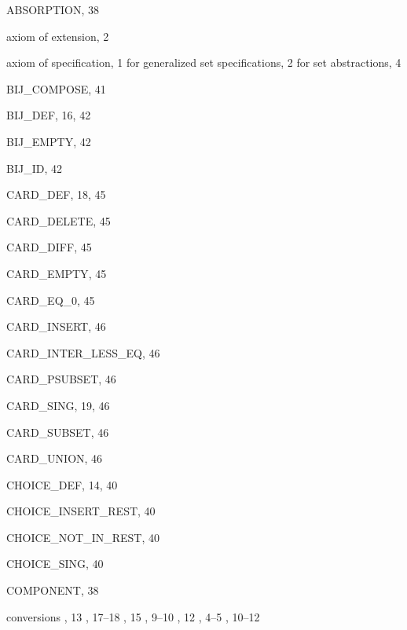 \begin{theindex}

  \item {\ptt ABSORPTION}, 38
  \item axiom of extension, 2
  \item axiom of specification, 1
    \subitem for generalized set specifications, 2
    \subitem for set abstractions, 4

  \indexspace

  \item {\ptt BIJ\_COMPOSE}, 41
  \item {\ptt BIJ\_DEF}, 16, 42
  \item {\ptt BIJ\_EMPTY}, 42
  \item {\ptt BIJ\_ID}, 42

  \indexspace

  \item {\ptt CARD\_DEF}, 18, 45
  \item {\ptt CARD\_DELETE}, 45
  \item {\ptt CARD\_DIFF}, 45
  \item {\ptt CARD\_EMPTY}, 45
  \item {\ptt CARD\_EQ\_0}, 45
  \item {\ptt CARD\_INSERT}, 46
  \item {\ptt CARD\_INTER\_LESS\_EQ}, 46
  \item {\ptt CARD\_PSUBSET}, 46
  \item {\ptt CARD\_SING}, 19, 46
  \item {\ptt CARD\_SUBSET}, 46
  \item {\ptt CARD\_UNION}, 46
  \item {\ptt CHOICE\_DEF}, 14, 40
  \item {\ptt CHOICE\_INSERT\_REST}, 40
  \item {\ptt CHOICE\_NOT\_IN\_REST}, 40
  \item {\ptt CHOICE\_SING}, 40
  \item {\ptt COMPONENT}, 38
  \item conversions
    , 13
    , 17--18
    , 15
    , 9--10
    , 12
    , 4--5
    , 10--12

  \indexspace


\end{theindex}
